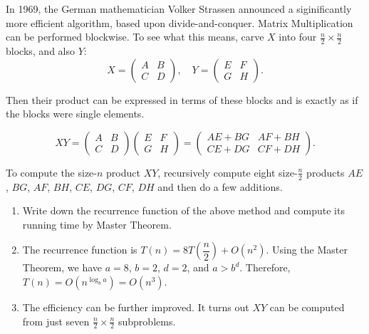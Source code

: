 \documentclass[12pt,a4paper]{article}
\makeatletter
\newtheorem*{solution}{Solution}
\theoremstyle{definition}
\renewenvironment{solution}[1][Solution] {\par\pushQED{\qed}\normalfont\topsep6\p@\@plus6\p@\relax\trivlist\item[\hskip\labelsep\bfseries#1\@addpunct{.}]\ignorespaces}{\popQED\endtrivlist\@endpefalse} \makeatother
\makeatother
\begin{document}
\begin{enumerate}
In 1969, the German mathematician Volker Strassen announced a siginificantly more efficient algorithm, based upon divide-and-conquer. Matrix Multiplication can be performed blockwise. To see what this means, carve $X$ into four $\frac{n}{2} \times \frac{n}{2}$ blocks, and also $Y$:
\begin{displaymath}
X=
\left(\begin{array}{c|c}
A & B \\
\hline
C & D \end{array}\right), \quad
Y=\left(\begin{array}{c|c}
E & F \\
\hline
G & H \end{array}\right).
 \end{displaymath}

Then their product can be expressed in terms of these blocks and is exactly as if the blocks were single elements.

 \begin{displaymath}
 XY=
\left(\begin{array}{c|c}
A & B \\
\hline
C & D \end{array}\right)
\left(\begin{array}{c|c}
E & F \\
\hline
G & H \end{array}\right)
=
\left(\begin{array}{c|c}
AE+BG & AF+BH \\
\hline
CE+DG & CF+DH \end{array}\right).
 \end{displaymath}

To compute the size-$n$ product $XY$, recursively compute eight size-$\frac{n}{2}$ products $AE$,  $BG$, $AF$, $BH$, $CE$, $DG$, $CF$, $DH$ and then do a few additions.

\begin{enumerate}
\item Write down the recurrence function of the above method and compute its running time by Master Theorem.

\begin{solution}
The recurrence function is $T(n)=8T(\dfrac{n}{2})+O(n^2)$. Using the Master Theorem, we have $a=8$, $b=2$, $d=2$, and $a>b^d$. Therefore, $T(n)=O(n^{\log_ba})=O(n^3)$.
\end{solution}

\item The efficiency can be further improved. It turns out $XY$ can be computed from just seven $\frac{n}{2}\times \frac{n}{2}$ subproblems.


\end{enumerate}
\end{enumerate}
\end{document}
